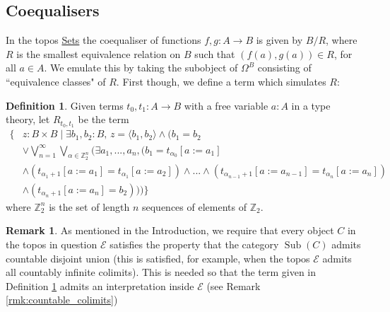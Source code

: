 \documentclass{birkjour}
\theoremstyle{plain}
\theoremstyle{definition}
\newtheorem{definition}[thm]{Definition} %
\newtheorem{remark}[thm]{Remark}
\newcommand{\bb}[1]{\mathbb{#1}}
\newcommand{\call}[1]{\mathcal{#1}}
\begin{document}
	\subsection{Coequalisers}
	\label{sec:coequaliser}
	In the topos \underline{Sets} the coequaliser of functions $f,g: A \to B$ is given by $B/R$, where $R$ is the smallest equivalence relation on $B$ such that $(f(a), g(a)) \in R$, for all $a \in A$. We emulate this by taking the subobject of $\Omega^B$ consisting of ``equivalence classes" of $R$. First though, we define a term which simulates $R$:
	\begin{definition}
		\label{def:relation}
		Given terms $t_0,t_1: A \to B$ with a free variable $a:A$ in a type theory, let $R_{t_0,t_1}$ be the term
		\begin{align*}
			\Big\lbrace &z: B \times B \mid \exists b_1, b_2 : B\text{, }z = \langle b_1, b_2 \rangle \wedge \Big(b_1 = b_2\\
			&\vee \bigvee_{n = 1}^\infty\bigvee_{\alpha \in \bb{Z}_2^n}\big( \exists a_1,...,a_n, (b_1 = t_{\alpha_0}[a:= a_1]\\
			&\wedge (t_{\alpha_1 + 1}[a:= a_1] = t_{\alpha_1}[a:= a_2]) \wedge ... \wedge (t_{\alpha_{n-1}+1}[a:= a_{n-1}] = t_{\alpha_{n}}[a:= a_n])\\
			&\wedge (t_{\alpha_{n}+1}[a:= a_n] = b_2)\big)\Big)\Big\rbrace
		\end{align*}
		where $\mathbb{Z}_2^n$ is the set of length $n$ sequences of elements of $\mathbb{Z}_{2}$. 
	\end{definition}
	\begin{remark}
		As mentioned in the Introduction, we require that every object $C$ in the topos in question $\call{E}$ satisfies the property that the category $\operatorname{Sub}(C)$ admits countable disjoint union (this is satisfied, for example, when the topos $\call{E}$ admits all countably infinite colimits). This is needed so that the term given in Definition \ref{def:relation} admits an interpretation inside $\call{E}$ (see Remark \ref{rmk:countable_colimits})
	\end{remark}
	
\end{document}
